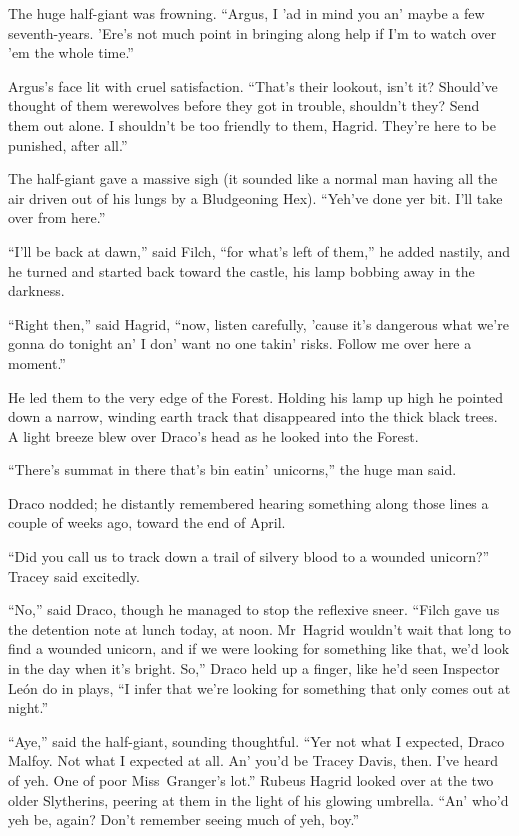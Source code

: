 The huge half-giant was frowning. “Argus, I ’ad in mind you an’ maybe a few seventh-years. ’Ere’s not much point in bringing along help if I’m to watch over ’em the whole time.”

Argus’s face lit with cruel satisfaction. “That’s their lookout, isn’t it? Should’ve thought of them werewolves before they got in trouble, shouldn’t they? Send them out alone. I shouldn’t be too friendly to them, Hagrid. They’re here to be punished, after all.”

The half-giant gave a massive sigh (it sounded like a normal man having all the air driven out of his lungs by a Bludgeoning Hex). “Yeh’ve done yer bit. I’ll take over from here.”

“I’ll be back at dawn,” said Filch, “for what’s left of them,” he added nastily, and he turned and started back toward the castle, his lamp bobbing away in the darkness.

“Right then,” said Hagrid, “now, listen carefully, ’cause it’s dangerous what we’re gonna do tonight an’ I don’ want no one takin’ risks. Follow me over here a moment.”

He led them to the very edge of the Forest. Holding his lamp up high he pointed down a narrow, winding earth track that disappeared into the thick black trees. A light breeze blew over Draco’s head as he looked into the Forest.

“There’s summat in there that’s bin eatin’ unicorns,” the huge man said.

Draco nodded; he distantly remembered hearing something along those lines a couple of weeks ago, toward the end of April.

“Did you call us to track down a trail of silvery blood to a wounded unicorn?” Tracey said excitedly.

“No,” said Draco, though he managed to stop the reflexive sneer. “Filch gave us the detention note at lunch today, at noon. Mr~Hagrid wouldn’t wait that long to find a wounded unicorn, and if we were looking for something like that, we’d look in the day when it’s bright. So,” Draco held up a finger, like he’d seen Inspector León do in plays, “I infer that we’re looking for something that only comes out at night.”

“Aye,” said the half-giant, sounding thoughtful. “Yer not what I expected, Draco Malfoy. Not what I expected at all. An’ you’d be Tracey Davis, then. I’ve heard of yeh. One of poor Miss~Granger’s lot.” Rubeus Hagrid looked over at the two older Slytherins, peering at them in the light of his glowing umbrella. “An’ who’d yeh be, again? Don’t remember seeing much of yeh, boy.”

